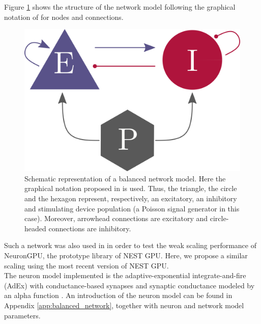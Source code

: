 \documentclass[a4paper, 12pt, twoside, openright]{book}
\begin{document}
Figure \ref{fig:balanced_network} shows the structure of the network model following the graphical notation of \cite{Senk2022} for nodes and connections.
\begin{figure}[H]
    \centering
    \includegraphics[scale=1.5]{figures/balanced_network.png}
    \caption{Schematic representation of a balanced network model. Here the graphical notation proposed in \cite{Senk2022} is used. Thus, the triangle, the circle and the hexagon represent, respectively, an excitatory, an inhibitory and stimulating device population (a Poisson signal generator in this case). Moreover, arrowhead connections are excitatory and circle-headed connections are inhibitory.}
    \label{fig:balanced_network}
\end{figure}

Such a network was also used in \cite{Golosio2021} in order to test the weak scaling performance of NeuronGPU, the prototype library of NEST GPU. Here, we propose a similar scaling using the most recent version of NEST GPU.\\
The neuron model implemented is the adaptive-exponential integrate-and-fire (AdEx) \cite{Brette2005} with conductance-based synapses and synaptic conductance modeled by an alpha function \cite{modeling_synapses}. An introduction of the neuron model can be found in Appendix \ref{app:balanced_network}, together with neuron and network model parameters.
\end{document}
